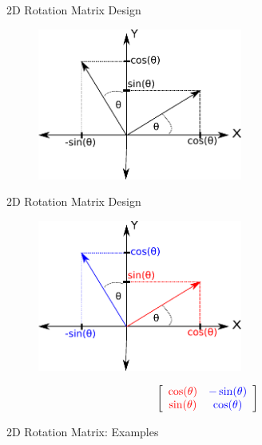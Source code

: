 \documentclass{beamer}
\begin{document}
\begin{frame}{2D Rotation Matrix Design}

\begin{figure}[t]
	\centering
    \includegraphics[width=0.6\textwidth]{ColumnVectorRot.pdf}
\end{figure}

\end{frame}

\begin{frame}{2D Rotation Matrix Design}

\begin{figure}[t]
	\centering
    \includegraphics[width=0.6\textwidth]{ColumnVectorRot2.pdf}
\end{figure}


\[ \left[ \begin{array}{cc} \textcolor{red}{\cos(\theta)} & \textcolor{blue}{-\sin(\theta)} \\ \textcolor{red}{\sin(\theta)} & \textcolor{blue}{\cos(\theta)} \end{array}  \right] \]

\end{frame}


\begin{frame}{2D Rotation Matrix: Examples}


\end{frame}
\end{document}
